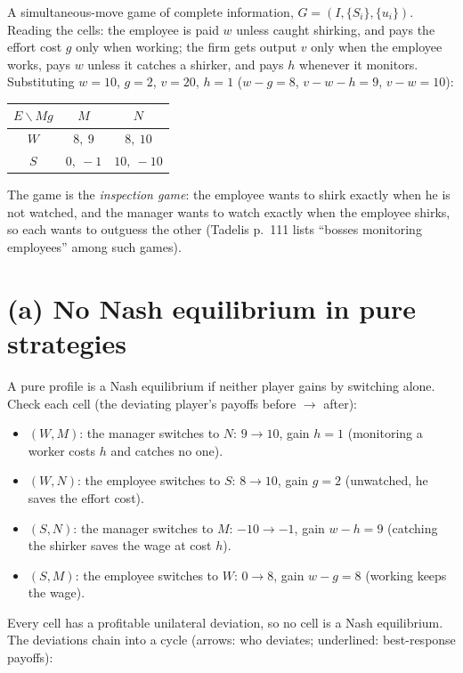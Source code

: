 \documentclass[11pt,a4paper]{article}
\begin{document}
A simultaneous-move game of complete information, $G = (I, \{S_i\}, \{u_i\})$. Reading the cells:
the employee is paid $w$ unless caught shirking, and pays the effort cost $g$ only when working; the
firm gets output $v$ only when the employee works, pays $w$ unless it catches a shirker, and pays $h$
whenever it monitors. Substituting $w = 10$, $g = 2$, $v = 20$, $h = 1$
($w - g = 8$, $v - w - h = 9$, $v - w = 10$):
\begin{center}
\begin{tabular}{c|cc}
$E \backslash M\!g$ & $M$ & $N$ \\ \midrule
$W$ & $8,\ 9$ & $8,\ 10$ \\
$S$ & $0,\ -1$ & $10,\ -10$
\end{tabular}
\end{center}
The game is the \emph{inspection game}: the employee wants to shirk exactly when he is not watched,
and the manager wants to watch exactly when the employee shirks, so each wants to outguess the other
(Tadelis p.~111 lists ``bosses monitoring employees'' among such games).

\section*{(a) No Nash equilibrium in pure strategies}

A pure profile is a Nash equilibrium if neither player gains by switching alone. Check each cell
(the deviating player's payoffs before $\to$ after):
\begin{itemize}
  \item $(W, M)$: the manager switches to $N$: $9 \to 10$, gain $h = 1$ (monitoring a worker costs $h$
        and catches no one).
  \item $(W, N)$: the employee switches to $S$: $8 \to 10$, gain $g = 2$ (unwatched, he saves the
        effort cost).
  \item $(S, N)$: the manager switches to $M$: $-10 \to -1$, gain $w - h = 9$ (catching the shirker
        saves the wage at cost $h$).
  \item $(S, M)$: the employee switches to $W$: $0 \to 8$, gain $w - g = 8$ (working keeps the wage).
\end{itemize}
Every cell has a profitable unilateral deviation, so no cell is a Nash equilibrium. The deviations
chain into a cycle (arrows: who deviates; underlined: best-response payoffs):
\end{document}
